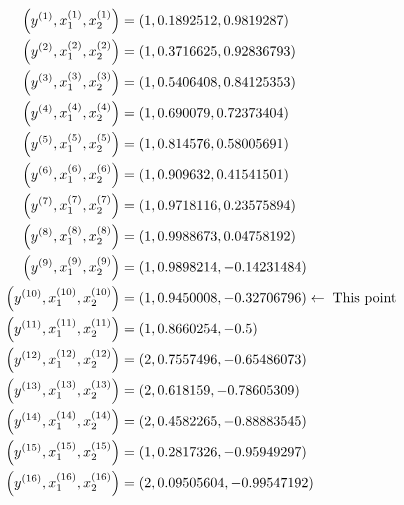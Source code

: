 \documentclass{article}
\begin{document}
\begin{align*}
\left(y^{\left(1\right)}, x_{1}^{\left(1\right)}, x_{2}^{\left(1\right)}\right) &= \left(1,0.1892512,0.9819287\right)
\\ \left(y^{\left(2\right)}, x_{1}^{\left(2\right)}, x_{2}^{\left(2\right)}\right) &= \left(1,0.3716625,0.92836793\right)
\\ \left(y^{\left(3\right)}, x_{1}^{\left(3\right)}, x_{2}^{\left(3\right)}\right) &= \left(1,0.5406408,0.84125353\right)
\\ \left(y^{\left(4\right)}, x_{1}^{\left(4\right)}, x_{2}^{\left(4\right)}\right) &= \left(1,0.690079,0.72373404\right)
\\ \left(y^{\left(5\right)}, x_{1}^{\left(5\right)}, x_{2}^{\left(5\right)}\right) &= \left(1,0.814576,0.58005691\right)
\\ \left(y^{\left(6\right)}, x_{1}^{\left(6\right)}, x_{2}^{\left(6\right)}\right) &= \left(1,0.909632,0.41541501\right)
\\ \left(y^{\left(7\right)}, x_{1}^{\left(7\right)}, x_{2}^{\left(7\right)}\right) &= \left(1,0.9718116,0.23575894\right)
\\ \left(y^{\left(8\right)}, x_{1}^{\left(8\right)}, x_{2}^{\left(8\right)}\right) &= \left(1,0.9988673,0.04758192\right)
\\ \left(y^{\left(9\right)}, x_{1}^{\left(9\right)}, x_{2}^{\left(9\right)}\right) &= \left(1,0.9898214,-0.14231484\right)
\\ \left(y^{\left(10\right)}, x_{1}^{\left(10\right)}, x_{2}^{\left(10\right)}\right) &= \left(1,0.9450008,-0.32706796\right) \leftarrow \text{\;This point\;}
\\ \left(y^{\left(11\right)}, x_{1}^{\left(11\right)}, x_{2}^{\left(11\right)}\right) &= \left(1,0.8660254,-0.5\right)
\\ \left(y^{\left(12\right)}, x_{1}^{\left(12\right)}, x_{2}^{\left(12\right)}\right) &= \left(2,0.7557496,-0.65486073\right)
\\ \left(y^{\left(13\right)}, x_{1}^{\left(13\right)}, x_{2}^{\left(13\right)}\right) &= \left(2,0.618159,-0.78605309\right)
\\ \left(y^{\left(14\right)}, x_{1}^{\left(14\right)}, x_{2}^{\left(14\right)}\right) &= \left(2,0.4582265,-0.88883545\right)
\\ \left(y^{\left(15\right)}, x_{1}^{\left(15\right)}, x_{2}^{\left(15\right)}\right) &= \left(1,0.2817326,-0.95949297\right)
\\ \left(y^{\left(16\right)}, x_{1}^{\left(16\right)}, x_{2}^{\left(16\right)}\right) &= \left(2,0.09505604,-0.99547192\right)

\end{align*}
\end{document}
